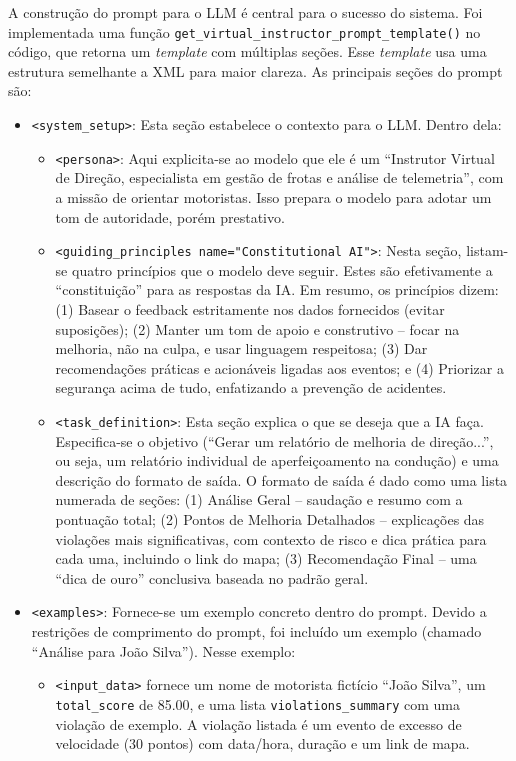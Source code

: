 \documentclass[12pt]{article}
\begin{document}
A construção do prompt para o LLM é central para o sucesso do sistema. Foi implementada uma função \verb|get_virtual_instructor_prompt_template()| no código, que retorna um \textit{template} com múltiplas seções. Esse \textit{template} usa uma estrutura semelhante a XML para maior clareza. As principais seções do prompt são:

\begin{itemize}
    \item \verb|<system_setup>|: Esta seção estabelece o contexto para o LLM. Dentro dela:
    \begin{itemize}
        \item \verb|<persona>|: Aqui explicita-se ao modelo que ele é um “Instrutor Virtual de Direção, especialista em gestão de frotas e análise de telemetria”, com a missão de orientar motoristas. Isso prepara o modelo para adotar um tom de autoridade, porém prestativo.
        \item \verb|<guiding_principles name="Constitutional AI">|: Nesta seção, listam-se quatro princípios que o modelo deve seguir. Estes são efetivamente a “constituição” para as respostas da IA. Em resumo, os princípios dizem: (1) Basear o feedback estritamente nos dados fornecidos (evitar suposições); (2) Manter um tom de apoio e construtivo – focar na melhoria, não na culpa, e usar linguagem respeitosa; (3) Dar recomendações práticas e acionáveis ligadas aos eventos; e (4) Priorizar a segurança acima de tudo, enfatizando a prevenção de acidentes.
        \item \verb|<task_definition>|: Esta seção explica o que se deseja que a IA faça. Especifica-se o objetivo (“Gerar um relatório de melhoria de direção...”, ou seja, um relatório individual de aperfeiçoamento na condução) e uma descrição do formato de saída. O formato de saída é dado como uma lista numerada de seções: (1) Análise Geral – saudação e resumo com a pontuação total; (2) Pontos de Melhoria Detalhados – explicações das violações mais significativas, com contexto de risco e dica prática para cada uma, incluindo o link do mapa; (3) Recomendação Final – uma “dica de ouro” conclusiva baseada no padrão geral.
    \end{itemize}
    \item \verb|<examples>|: Fornece-se um exemplo concreto dentro do prompt. Devido a restrições de comprimento do prompt, foi incluído um exemplo (chamado “Análise para João Silva”). Nesse exemplo:
    \begin{itemize}
        \item \verb|<input_data>| fornece um nome de motorista fictício “João Silva”, um \verb|total_score| de 85.00, e uma lista \verb|violations_summary| com uma violação de exemplo. A violação listada é um evento de excesso de velocidade (30 pontos) com data/hora, duração e um link de mapa.

\end{itemize}
\end{itemize}
\end{document}
